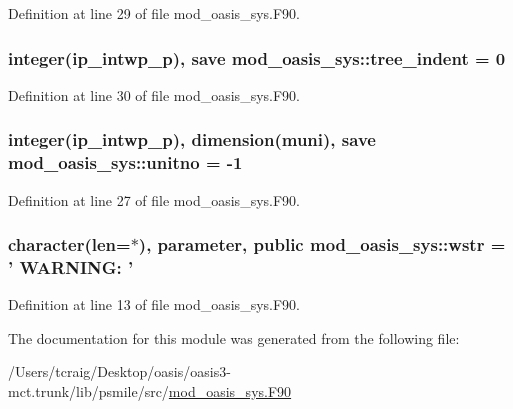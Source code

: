 Definition at line 29 of file mod\+\_\+oasis\+\_\+sys.\+F90.

\hypertarget{classmod__oasis__sys_a159b60d106efcb1f42722b08c5511ad0}{
\subsubsection[{tree\+\_\+indent}]{\setlength{\rightskip}{0pt plus 5cm}integer(ip\+\_\+intwp\+\_\+p), save mod\+\_\+oasis\+\_\+sys\+::tree\+\_\+indent = 0\hspace{0.3cm}{\ttfamily [private]}}}\label{classmod__oasis__sys_a159b60d106efcb1f42722b08c5511ad0}


Definition at line 30 of file mod\+\_\+oasis\+\_\+sys.\+F90.

\hypertarget{classmod__oasis__sys_a0fc21eee7f67c5be26a90e23d8c346db}{
\subsubsection[{unitno}]{\setlength{\rightskip}{0pt plus 5cm}integer(ip\+\_\+intwp\+\_\+p), dimension({\bf muni}), save mod\+\_\+oasis\+\_\+sys\+::unitno = -\/1\hspace{0.3cm}{\ttfamily [private]}}}\label{classmod__oasis__sys_a0fc21eee7f67c5be26a90e23d8c346db}


Definition at line 27 of file mod\+\_\+oasis\+\_\+sys.\+F90.

\hypertarget{classmod__oasis__sys_a4e16ba69c68a3a39c8b8aa3b92234ce1}{
\subsubsection[{wstr}]{\setlength{\rightskip}{0pt plus 5cm}character(len=$\ast$), parameter, public mod\+\_\+oasis\+\_\+sys\+::wstr = ' W\+A\+R\+N\+I\+N\+G\+: '}}\label{classmod__oasis__sys_a4e16ba69c68a3a39c8b8aa3b92234ce1}


Definition at line 13 of file mod\+\_\+oasis\+\_\+sys.\+F90.



The documentation for this module was generated from the following file\+:\begin{DoxyCompactItemize}
\item 
/\+Users/tcraig/\+Desktop/oasis/oasis3-\/mct.\+trunk/lib/psmile/src/\hyperlink{mod__oasis__sys_8_f90}{mod\+\_\+oasis\+\_\+sys.\+F90}\end{DoxyCompactItemize}
